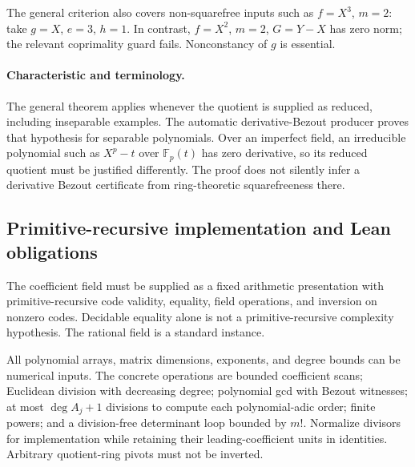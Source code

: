 The general criterion also covers non-squarefree inputs such as
\(f=X^3\), \(m=2\): take \(g=X\), \(e=3\), \(h=1\).
In contrast, \(f=X^2\), \(m=2\), \(G=Y-X\) has zero norm;
the relevant coprimality guard fails.  Nonconstancy of \(g\) is essential.

\paragraph{Characteristic and terminology.}
The general theorem applies whenever the quotient is supplied as reduced,
including inseparable examples.  The automatic derivative-Bezout
producer proves that hypothesis for separable polynomials.  Over an
imperfect field, an irreducible polynomial such as \(X^p-t\) over
\(\mathbb F_p(t)\) has zero derivative, so its reduced quotient must
be justified differently.  The proof does not silently infer a derivative
Bezout certificate from ring-theoretic squarefreeness there.

\subsection{Primitive-recursive implementation and Lean obligations}

The coefficient field must be supplied as a fixed arithmetic presentation
with primitive-recursive code validity, equality, field operations, and
inversion on nonzero codes.  Decidable equality alone is not a
primitive-recursive complexity hypothesis.  The rational field is a
standard instance.

All polynomial arrays, matrix dimensions, exponents, and degree bounds can
be numerical inputs.  The concrete operations are bounded coefficient
scans; Euclidean division with decreasing degree; polynomial gcd with
Bezout witnesses; at most \(\deg A_j+1\) divisions to compute each
polynomial-adic order; finite powers; and a division-free determinant loop
bounded by \(m!\).  Normalize divisors for implementation while retaining
their leading-coefficient units in identities.  Arbitrary quotient-ring
pivots must not be inverted.


